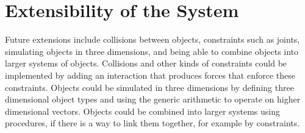 \documentclass{article}
\begin{document}
\section{Extensibility of the System}
Future extensions include collisions between objects, constraints such as
joints, simulating objects in three dimensions, and being able to combine
objects into larger systems of objects. Collisions and other kinds of
constraints could be implemented by adding an interaction that produces forces
that enforce these constraints. Objects could be simulated in three dimensions
by defining three dimensional object types and using the generic arithmetic to
operate on higher dimensional vectors. Objects could be combined into larger
systems using procedures, if there is a way to link them together, for example
by constraints.
\end{document}
